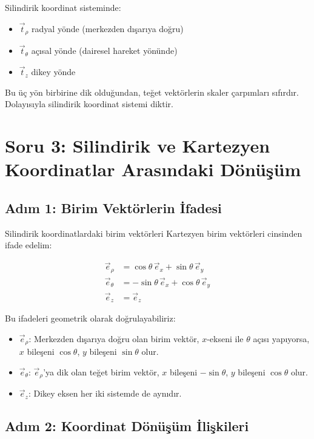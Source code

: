 \documentclass[11pt,letterpaper,twocolumn]{fenbil}
\begin{document}
Silindirik koordinat sisteminde:
\begin{itemize}
    \item $\vec{t}_\rho$ radyal yönde (merkezden dışarıya doğru)
    \item $\vec{t}_\theta$ açısal yönde (dairesel hareket yönünde)
    \item $\vec{t}_z$ dikey yönde
\end{itemize}

Bu üç yön birbirine dik olduğundan, teğet vektörlerin skaler çarpımları sıfırdır. Dolayısıyla silindirik koordinat sistemi diktir.

\section*{Soru 3: Silindirik ve Kartezyen Koordinatlar Arasındaki Dönüşüm}

\subsection*{Adım 1: Birim Vektörlerin İfadesi}

Silindirik koordinatlardaki birim vektörleri Kartezyen birim vektörleri cinsinden ifade edelim:

\begin{align}
    \vec{e}_\rho &= \cos\theta \, \vec{e}_x + \sin\theta \, \vec{e}_y \\
    \vec{e}_\theta &= -\sin\theta \, \vec{e}_x + \cos\theta \, \vec{e}_y \\
    \vec{e}_z &= \vec{e}_z
\end{align}

Bu ifadeleri geometrik olarak doğrulayabiliriz:
\begin{itemize}
    \item $\vec{e}_\rho$: Merkezden dışarıya doğru olan birim vektör, $x$-ekseni ile $\theta$ açısı yapıyorsa, $x$ bileşeni $\cos\theta$, $y$ bileşeni $\sin\theta$ olur.
    \item $\vec{e}_\theta$: $\vec{e}_\rho$'ya dik olan teğet birim vektör, $x$ bileşeni $-\sin\theta$, $y$ bileşeni $\cos\theta$ olur.
    \item $\vec{e}_z$: Dikey eksen her iki sistemde de aynıdır.
\end{itemize}

\subsection*{Adım 2: Koordinat Dönüşüm İlişkileri}
\end{document}
